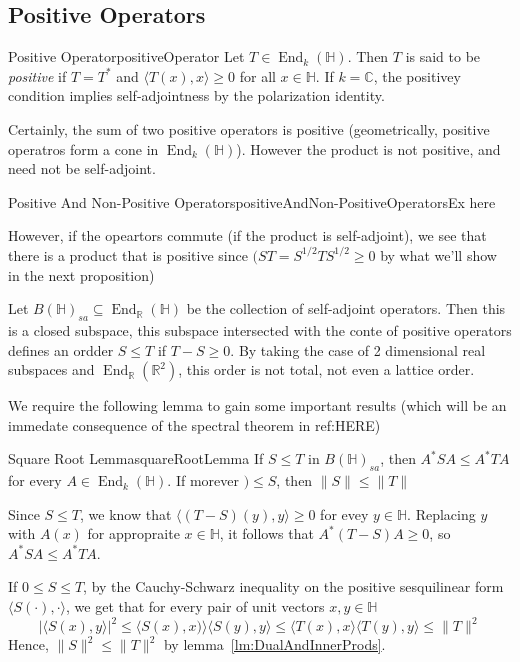 \documentclass[oneside]{book}
\newcommand{\R}{\mathbb{R}}
\newcommand{\C}{\mathbb{C}}
\renewcommand{\H}{\mathbb{H}}
\newcommand{\sse}{\subseteq}
\newcommand{\End}{\operatorname{End}}
\begin{document}
\subsection*{Positive Operators}

\begin{defn}{Positive Operator}{positiveOperator}
	Let $T \in \End_k(\H)$. Then $T$ is said to be \emph{positive} if $T = T^*$ and $ \langle T(x),
	x \rangle \ge 0$ for all $x \in \H$. If $k = \C$, the positivey condition implies self-adjointness by the
	polarization identity.
\end{defn}

Certainly, the sum of two positive operators is positive (geometrically, positive operatros form a cone in
$\End_k(\H)$). However the product is not positive, and need not be self-adjoint.




\begin{example}{Positive And Non-Positive Operators}{positiveAndNon-PositiveOperatorsEx}
	here

	However, if the opeartors commute (if the product is self-adjoint), we see that there is a product that is
	positive since $(ST = S^{1/2}TS^{1/2} \ge 0$ by what we'll show in the next proposition)
\end{example}

Let $B(\H)_{sa} \sse \End_\R(\H)$ be the collection of self-adjoint operators. Then  this is a closed subspace,
this subspace intersected with the conte of positive operators defines an ordder $S \le T$ if $T-S \ge 0$. By taking
the case of 2 dimensional real subspaces and $\End_\R(\R^2)$, this order is not total, not even a lattice order.

We
require the following lemma to gain some important results (which will be an immedate consequence of the spectral
theorem in ref:HERE)

\begin{lem}{Square Root Lemma}{squareRootLemma}
	If $S \le T$ in $B(\H)_{sa}$, then $A^*SA \le A^*TA$ for every $A \in \End_k(\H)$. If morever $) \le S$,
	then $\|S\| \le \|T\|$
\end{lem}

\begin{Proof}
	Since $S \le T$, we know that $ \langle (T-S)(y), y \rangle \ge 0$ for evey $y \in \H$. Replacing $y$ with
	$A(x)$ for appropraite $x \in \H$, it follows that $A^*(T-S)A \ge 0$, so $A^*SA \le A^*TA$.

	If $0 \le S \le T$, by the Cauchy-Schwarz inequality on the positive sesquilinear form $\langle S(\cdot),
	\cdot\rangle$, we get that for every pair of unit vectors $x,y \in \H$
	\[
		| \langle S(x) , y\rangle|^2 \le \langle S(x), x) \rangle \langle S(y), y \rangle \le \langle
		T(x), x \rangle \langle T(y), y \rangle \le \|T\|^2
	\]
	Hence, $\|S\|^2 \le \|T\|^2$ by lemma~\ref{lm:DualAndInnerProds}.
\end{Proof}
\end{document}

